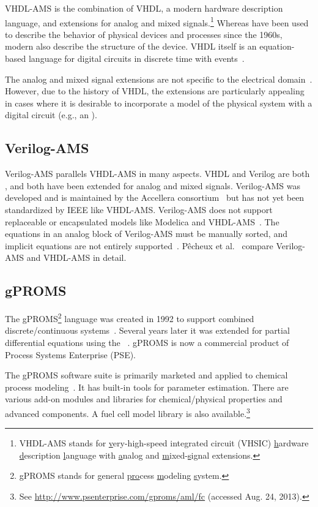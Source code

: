 VHDL-AMS is the combination of VHDL, a modern hardware description language, and extensions for analog and mixed signals.\footnote{VHDL-AMS stands for \underline{v}ery-high-speed integrated circuit (VHSIC) \underline{h}ardware \underline{d}escription \underline{l}anguage with \underline{a}nalog and \underline{m}ixed-\underline{s}ignal extensions.}  Whereas  have been used to describe the behavior of physical devices and processes since the 1960s, modern  also describe the structure of the device.  VHDL itself is an equation-based language for digital circuits in discrete time with events~\cite{Christen1999}.

The analog and mixed signal extensions are not specific to the electrical domain~\cite{Christen1999, VHDLAMS2007}.  However, due to the history of VHDL, the extensions are particularly appealing in cases where it is desirable to incorporate a model of the physical system with a digital circuit (e.g., an ).


\subsection{Verilog-AMS}

Verilog-AMS parallels VHDL-AMS in many aspects.  VHDL and Verilog are both , and both have been extended for analog and mixed signals.  Verilog-AMS was developed and is maintained by the Accellera consortium~\cite{VerilogAMS2.3.4} but has not yet been standardized by IEEE like VHDL-AMS\@.  Verilog-AMS does not support replaceable or encapsulated models like Modelica and VHDL-AMS~\cite{Pecheux2005}.  The equations in an analog block of Verilog-AMS must be manually sorted, and implicit equations are not entirely supported~\cite{Pecheux2005}.  P\^echeux et al.~\cite{Pecheux2005} compare Verilog-AMS and VHDL-AMS in detail.


\subsection{gPROMS}

The gPROMS\footnote{gPROMS stands for \underline{g}eneral \underline{pro}cess \underline{m}odeling \underline{s}ystem.} language was created in 1992 to support combined discrete\slash{}continuous systems~\cite{Barton1992}.  Several years later it was extended for partial differential equations using the ~\cite{Oh1996}.  gPROMS is now a commercial product of Process Systems Enterprise (PSE).

The gPROMS software suite is primarily marketed and applied to chemical process modeling~\cite{Broman2010}.  It has built-in tools for parameter estimation.  There are various add-on modules and libraries for chemical\slash{}physical properties and advanced components.  A fuel cell model library is also available.\footnote{See \url{http://www.psenterprise.com/gproms/aml/fc} (accessed Aug. 24, 2013).}


